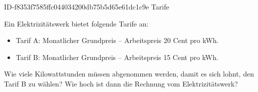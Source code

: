 \begin{exercise}
      {ID-f8353f7585ffc044034200db75b5d65e61dc1c9e}
      {Tarife}
  \ifproblem\problem\par
    Ein Elektrizitätswerk bietet folgende Tarife an:
    \begin{itemize}
      \item Tarif A: Monatlicher Grundpreis  -- Arbeitspreis 20 Cent pro kWh.
      \item Tarif B: Monatlicher Grundpreis  -- Arbeitspreis 15 Cent pro kWh.
    \end{itemize}
    Wie viele Kilowattstunden müssen abgenommen werden, damit es sich lohnt,
    den Tarif B zu wählen? Wie hoch ist dann die Rechnung vom Elektrizitätswerk?
  \fi
\end{exercise}
